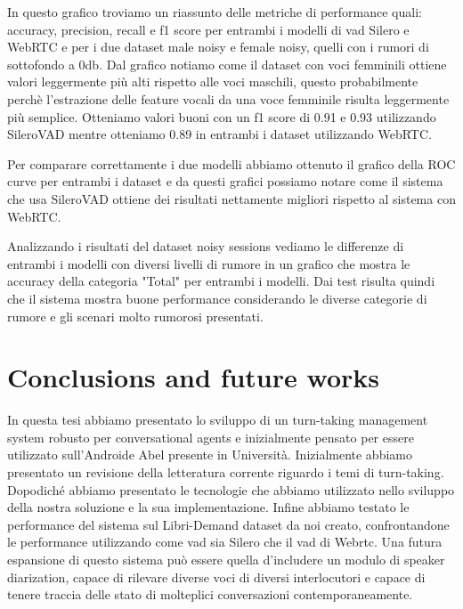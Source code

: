 \documentclass[12pt]{article}
\begin{document}
In questo grafico troviamo un riassunto delle metriche di performance quali: accuracy, precision, recall e f1 score per entrambi i modelli di vad Silero e WebRTC e per i due dataset male noisy e female noisy, quelli con i rumori di sottofondo a 0db. Dal grafico notiamo come il dataset con voci femminili ottiene valori leggermente più alti rispetto alle voci maschili, questo probabilmente perchè l'estrazione delle feature vocali da una voce femminile risulta leggermente più semplice. Otteniamo valori buoni con un f1 score di 0.91 e 0.93 utilizzando SileroVAD mentre otteniamo 0.89 in entrambi i dataset utilizzando WebRTC. 

Per comparare correttamente i due modelli abbiamo ottenuto il grafico della ROC curve per entrambi i dataset e da questi grafici possiamo notare come il sistema che usa SileroVAD ottiene dei risultati nettamente migliori rispetto al sistema con WebRTC.

Analizzando i risultati del dataset noisy sessions vediamo le differenze di entrambi i modelli con diversi livelli di rumore in un grafico che mostra le accuracy della categoria "Total" per entrambi i modelli. Dai test risulta quindi che il sistema mostra buone performance considerando le diverse categorie di rumore e gli scenari molto rumorosi presentati. 

\section{Conclusions and future works}

In questa tesi abbiamo presentato lo sviluppo di un turn-taking management system robusto per conversational agents e inizialmente pensato per essere utilizzato sull'Androide Abel presente in Università. Inizialmente abbiamo presentato un revisione della letteratura corrente riguardo i temi di turn-taking. Dopodiché abbiamo presentato le tecnologie che abbiamo utilizzato nello sviluppo della nostra soluzione e la sua implementazione. Infine abbiamo testato le performance del sistema sul Libri-Demand dataset da noi creato, confrontandone le performance utilizzando come vad sia Silero che il vad di Webrtc. Una futura espansione di questo sistema può essere quella d'includere un modulo di speaker diarization, capace di rilevare diverse voci di diversi interlocutori e capace di tenere traccia delle stato di molteplici conversazioni contemporaneamente.
\end{document}
